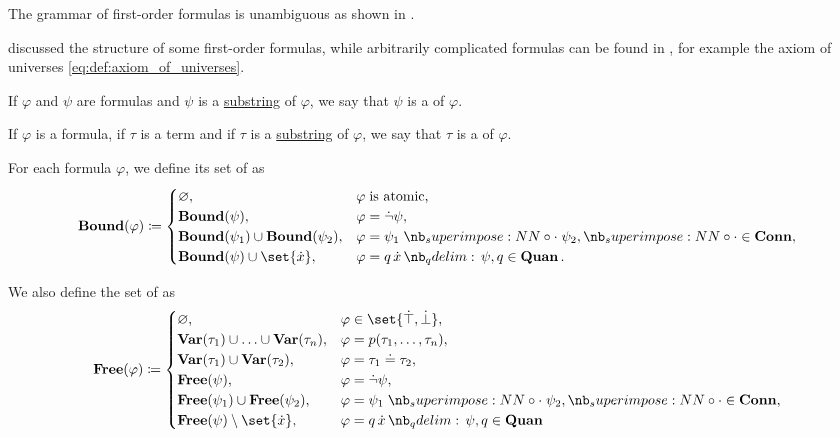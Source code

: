 \begin{definition}
\begin{thmenum}
    The grammar of first-order formulas is unambiguous as shown in .

     discussed the structure of some first-order formulas, while arbitrarily complicated formulas can be found in , for example the axiom of universes \eqref{eq:def:axiom_of_universes}.

     If \( \varphi \) and \( \psi \) are formulas and \( \psi \) is a \hyperref[def:formal_language/substring]{substring} of \( \varphi \), we say that \( \psi \) is a  of \( \varphi \).

     If \( \varphi \) is a formula, if \( \tau \) is a term and if \( \tau \) is a \hyperref[def:formal_language/substring]{substring} of \( \varphi \), we say that \( \tau \) is a  of \( \varphi \).

     For each formula \( \varphi \), we define its set of  as
    \begin{equation*}
      \op*{Bound}(\varphi) \coloneqq \begin{cases}
        \varnothing,                                        &\varphi \T{is atomic,} \\
        \op*{Bound}(\psi),                               &\varphi = \synneg \psi, \\
        \op*{Bound}(\psi_1) \cup \op*{Bound}(\psi_2), &\varphi = \psi_1 \syncirc \psi_2, {\syncirc} \in \op*{Conn}, \\
        \op*{Bound}(\psi) \cup \set{ \synx },              &\varphi = \quantifier{q}{\synx} \psi, q \in \op*{Quan}.
      \end{cases}
    \end{equation*}

     We also define the set of  as
    \begin{equation*}
      \op*{Free}(\varphi) \coloneqq \begin{cases}
        \varnothing,                                                &\varphi \in \set{ \syntop, \synbot }, \\
        \op*{Var}(\tau_1) \cup \ldots \cup \op*{Var}(\tau_n), &\varphi = p(\tau_1, \ldots, \tau_n), \\
        \op*{Var}(\tau_1) \cup \op*{Var}(\tau_2),             &\varphi = \tau_1 \syneq \tau_2, \\
        \op*{Free}(\psi),                                        &\varphi = \synneg \psi, \\
        \op*{Free}(\psi_1) \cup \op*{Free}(\psi_2),           &\varphi = \psi_1 \syncirc \psi_2, {\syncirc} \in \op*{Conn}, \\
        \op*{Free}(\psi) \setminus \set{ \synx },                  &\varphi = \quantifier{q}{\synx} \psi, q \in \op*{Quan}
      \end{cases}
    \end{equation*}


\end{thmenum}
\end{definition}
